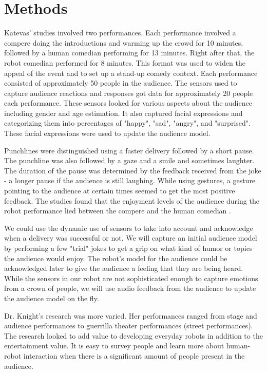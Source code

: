 \documentclass[onecolumn, draftclsnofoot,10pt, compsoc]{IEEEtran}
\begin{document}
\section{Methods}

Katevas' studies involved two performances. Each performance involved a compere doing the introductions and warming up the crowd for 10 minutes, followed by a human comedian performing for 13 minutes. Right after that, the robot comedian performed for 8 minutes. This format was used to widen the appeal of the event and to set up a stand-up comedy context. Each performance consisted of approximately 50 people in the audience. The sensors used to capture audience reactions and responses got data for approximately 20 people each performance. These sensors looked for various aspects about the audience including gender and age estimation. It also captured facial expressions and categorizing them into percentages of "happy", "sad", "angry", and "surprised". These facial expressions were used to update the audience model.

Punchlines were distinguished using a faster delivery followed by a short pause. The punchline was also followed by a gaze and a smile and sometimes laughter. The duration of the pause was determined by the feedback received from the joke - a longer pause if the audience is still laughing. While using gestures, a gesture pointing to the audience at certain times seemed to get the most positive feedback. The studies found that the enjoyment levels of the audience during the robot performance lied between the compere and the human comedian \cite{RobotComedyLab:2015}. 

We could use the dynamic use of sensors to take into account and acknowledge when a delivery was successful or not. We will capture an initial audience model by performing a few "trial" jokes to get a grip on what kind of humor or topics the audience would enjoy. The robot's model for the audience could be acknowledged later to give the audience a feeling that they are being heard. While the sensors in our robot are not sophisticated enough to capture emotions from a crown of people, we will use audio feedback from the audience to update the audience model on the fly.

Dr. Knight's research was more varied. Her performances ranged from stage and audience performances to guerrilla theater performances (street performances). The research looked to add value to developing everyday robots in addition to the entertainment value. It is easy to survey people and learn more about human-robot interaction when there is a significant amount of people present in the audience. 
\end{document}
